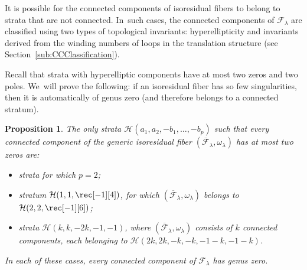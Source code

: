 \documentclass[JEP,XML,SOM,Unicode,NoFloatCountersInSection,published]{cedram}
\newtheorem{prop}[thm]{Proposition}
\theoremstyle{definition}
\begin{document}

It is possible for the connected components of isoresidual fibers to belong to strata that are not connected. In~such cases, the connected components of $\mathcal F_\lambda$ are classified using two types of topological invariants: hyperellipticity and invariants derived from the winding numbers of loops in the translation structure (see Section~\ref{sub:CCClassification}).

Recall that strata with hyperelliptic components have at most two zeros and two poles. We~will prove the following: if an isoresidual fiber has so few singularities, then it is automatically of genus zero (and therefore belongs to a connected stratum).
\begin{prop}\label{prop:AdditionalTwozeros}
The only strata $\mathcal{H}(a_{1},a_{2},-b_{1},\dots,-b_{p})$ such that every connected component of the generic isoresidual fiber $(\overline{\mathcal{F}}_{\lambda},\omega_{\lambda})$ has at most two zeros are:
\begin{itemize}
\item strata for which $p=2$;
\item stratum $\mathcal{H}(1,1,\rec[-1][4])$, for which $(\overline{\mathcal{F}}_{\lambda},\omega_{\lambda})$ belongs to $\mathcal{H}(2,2,\rec[-1][6])$;
\item strata $\mathcal{H}(k,k,-2k,-1,-1)$, where $(\overline{\mathcal{F}}_{\lambda},\omega_{\lambda})$ consists of $k$ connected components, each belonging to $\mathcal{H}(2k,2k,-k,-k,-1-k,-1-k)$.
\end{itemize}
In each of these cases, every connected component of $\mathcal{F}_{\lambda}$ has genus zero.
\end{prop}
\end{document}
